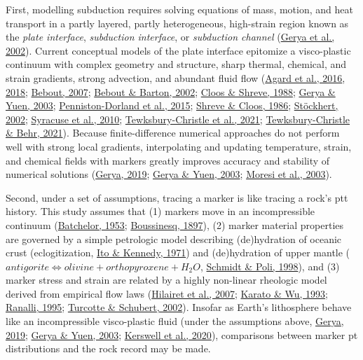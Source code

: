 First, modelling subduction requires solving equations of mass, motion, and heat transport in a partly layered, partly heterogeneous, high-strain region known as the \emph{plate interface}, \emph{subduction interface}, or \emph{subduction channel} (\protect\hyperlink{ref-gerya2002}{Gerya et al., 2002}). Current conceptual models of the plate interface epitomize a visco-plastic continuum with complex geometry and structure, sharp thermal, chemical, and strain gradients, strong advection, and abundant fluid flow (\protect\hyperlink{ref-agard2016}{Agard et al., 2016}, \protect\hyperlink{ref-agard2018}{2018}; \protect\hyperlink{ref-bebout2007}{Bebout, 2007}; \protect\hyperlink{ref-bebout2002}{Bebout \& Barton, 2002}; \protect\hyperlink{ref-cloos1988}{Cloos \& Shreve, 1988}; \protect\hyperlink{ref-gerya2003}{Gerya \& Yuen, 2003}; \protect\hyperlink{ref-penniston2015}{Penniston-Dorland et al., 2015}; \protect\hyperlink{ref-shreve1986}{Shreve \& Cloos, 1986}; \protect\hyperlink{ref-stockhert2002}{Stöckhert, 2002}; \protect\hyperlink{ref-syracuse2010}{Syracuse et al., 2010}; \protect\hyperlink{ref-tewksbury2021a}{Tewksbury-Christle et al., 2021}; \protect\hyperlink{ref-tewksbury2021b}{Tewksbury-Christle \& Behr, 2021}). Because finite-difference numerical approaches do not perform well with strong local gradients, interpolating and updating temperature, strain, and chemical fields with markers greatly improves accuracy and stability of numerical solutions (\protect\hyperlink{ref-gerya2019}{Gerya, 2019}; \protect\hyperlink{ref-gerya2003}{Gerya \& Yuen, 2003}; \protect\hyperlink{ref-moresi2003}{Moresi et al., 2003}).

Second, under a set of assumptions, tracing a marker is like tracing a rock's \gls{ptt} history. This study assumes that (1) markers move in an incompressible continuum (\protect\hyperlink{ref-batchelor1953}{Batchelor, 1953}; \protect\hyperlink{ref-boussinesq1897}{Boussinesq, 1897}), (2) marker material properties are governed by a simple petrologic model describing (de)hydration of oceanic crust (eclogitization, \protect\hyperlink{ref-ito1971}{Ito \& Kennedy, 1971}) and (de)hydration of upper mantle (\(antigorite \allowbreak \Leftrightarrow olivine + orthopyroxene + H_{2}O\), \protect\hyperlink{ref-schmidt1998}{Schmidt \& Poli, 1998}), and (3) marker stress and strain are related by a highly non-linear rheologic model derived from empirical flow laws (\protect\hyperlink{ref-hilairet2007}{Hilairet et al., 2007}; \protect\hyperlink{ref-karato1993}{Karato \& Wu, 1993}; \protect\hyperlink{ref-ranalli1995}{Ranalli, 1995}; \protect\hyperlink{ref-turcotte2002}{Turcotte \& Schubert, 2002}). Insofar as Earth's lithosphere behave like an incompressible visco-plastic fluid (under the assumptions above, \protect\hyperlink{ref-gerya2019}{Gerya, 2019}; \protect\hyperlink{ref-gerya2003}{Gerya \& Yuen, 2003}; \protect\hyperlink{ref-kerswell2020}{Kerswell et al., 2020}), comparisons between marker \gls{pt} distributions and the rock record may be made.

